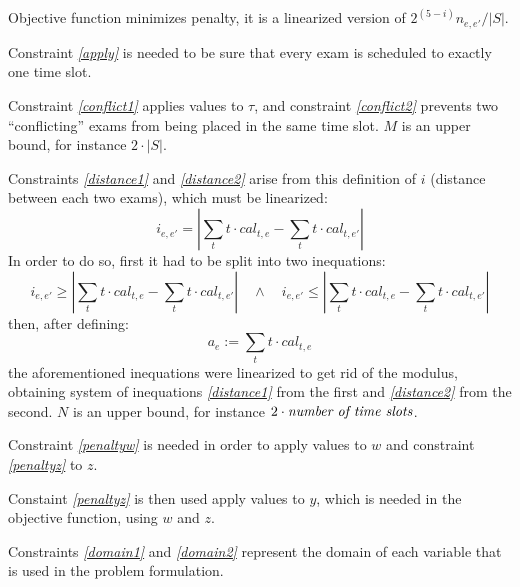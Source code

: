 \documentclass[11pt, a4paper, leqno]{article}
\newcommand{\eq}[1]{\textit{\ref{#1}}}
\begin{document}
	Objective function minimizes penalty, it is a linearized version of $2^{(5-i)}n_{e,e'}/\left|S\right|$.
	
	Constraint \eq{apply} is needed to be sure that every exam is scheduled to exactly one time slot.
	
	Constraint \eq{conflict1} applies values to $\tau$, and constraint \eq{conflict2} prevents two ``conflicting'' exams from being placed in the same time slot. $M$ is an upper bound, for instance $2\cdot\left|S\right|$.
	
	Constraints \eq{distance1} and \eq{distance2} arise from this definition of $i$ (distance between each two exams), which must be linearized:
	\[
	i_{e,e'} = \left|\sum_{t} t\cdot cal_{t,e} - \sum_{t} t\cdot cal_{t,e'}\right|
	\]
	In order to do so, first it had to be split into two inequations:
	\[
		i_{e,e'} \geq \left|\sum_{t} t\cdot cal_{t,e} - \sum_{t} t\cdot cal_{t,e'}\right| \quad \land \quad i_{e,e'} \leq \left|\sum_{t} t\cdot cal_{t,e} - \sum_{t} t\cdot cal_{t,e'}\right|
	\]
	then, after defining:
	\[
	a_e := \sum_{t} t\cdot cal_{t,e}
	\]
	the aforementioned inequations were linearized to get rid of the modulus, obtaining system of inequations \eq{distance1} from the first and \eq{distance2} from the second. $N$ is an upper bound, for instance \mbox{$2\cdot\text{\textit{number of time slots}}$}.

	Constraint \eq{penaltyw} is needed in order to apply values to $w$ and constraint \eq{penaltyz} to $z$.
	
	Constaint \eq{penaltyz} is then used apply values to $y$, which is needed in the objective function, using $w$ and $z$.
	
	Constraints \eq{domain1} and \eq{domain2} represent the domain of each variable that is used in the problem formulation.
\end{document}
